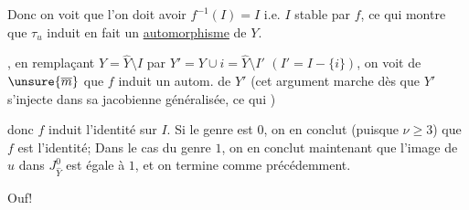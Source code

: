 

 Donc on voit que l'on doit avoir $f^{-1}(I)=I$ i.e. $I$ stable par $f$, ce qui montre que $\tau_u$ induit en fait un \uline{automorphisme} de $Y$.


, en remplaçant $Y=\widehat Y\setminus I$ par $Y'=Y\cup i=\widehat Y\setminus I'$ $(I'=I-\{i\})$, on voit de $\unsure{\overline m}$ que $f$ induit un autom. de $Y'$ (cet argument marche dès que $Y'$ s'injecte dans sa jacobienne généralisée, ce qui  )

 donc $f$ induit l'identité sur $I$. Si le genre est $0$, on en conclut (puisque $\nu\geq3$) que $f$ est l'identité;  Dans le cas du genre $1$, on en conclut maintenant que l'image de $u$ dans $J_{\widehat Y}^0$ est égale à $1$, et on termine comme précédemment.

Ouf!
